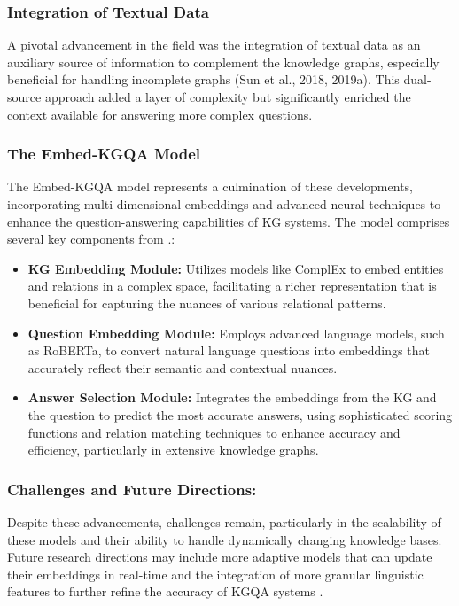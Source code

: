 \documentclass{article}
\begin{document}
\subsubsection{Integration of Textual Data}
A pivotal advancement in the field was the integration of textual data as an auxiliary source of information to complement the knowledge graphs, especially beneficial for handling incomplete graphs (Sun et al., 2018, 2019a). This dual-source approach added a layer of complexity but significantly enriched the context available for answering more complex questions.

\subsubsection{The Embed-KGQA Model}
The Embed-KGQA model \parencite{saxena-etal-2020-improving} represents a culmination of these developments, incorporating multi-dimensional embeddings and advanced neural techniques to enhance the question-answering capabilities of KG systems. The model comprises several key components from \textcite{Pan2023UnifyingLL}.:
\sloppy
\begin{itemize}
    \item \textbf{KG Embedding Module:} Utilizes models like ComplEx to embed entities and relations in a complex space, facilitating a richer representation that is beneficial for capturing the nuances of various relational patterns.
    \item \textbf{Question Embedding Module:} Employs advanced language models, such as RoBERTa, to convert natural language questions into embeddings that accurately reflect their semantic and contextual nuances.
    \item \textbf{Answer Selection Module:} Integrates the embeddings from the KG and the question to predict the most accurate answers, using sophisticated scoring functions and relation matching techniques to enhance accuracy and efficiency, particularly in extensive knowledge graphs.

\end{itemize}
\fussy
\subsubsection{Challenges and Future Directions:} Despite these advancements, challenges remain, particularly in the scalability of these models and their ability to handle dynamically changing knowledge bases. Future research directions may include more adaptive models that can update their embeddings in real-time and the integration of more granular linguistic features to further refine the accuracy of KGQA systems \parencite{Pan2023UnifyingLL}.
\end{document}
